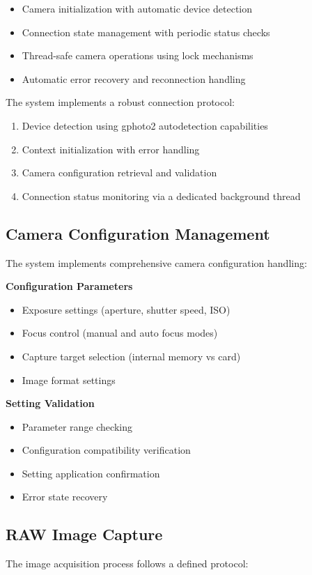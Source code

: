 \begin{itemize}
    \item Camera initialization with automatic device detection
    \item Connection state management with periodic status checks
    \item Thread-safe camera operations using lock mechanisms
    \item Automatic error recovery and reconnection handling
\end{itemize}

The system implements a robust connection protocol:
\begin{enumerate}
    \item Device detection using gphoto2 autodetection capabilities
    \item Context initialization with error handling
    \item Camera configuration retrieval and validation
    \item Connection status monitoring via a dedicated background thread
\end{enumerate}

\subsection{Camera Configuration Management}
The system implements comprehensive camera configuration handling:

\textbf{Configuration Parameters}
\begin{itemize}
    \item Exposure settings (aperture, shutter speed, ISO)
    \item Focus control (manual and auto focus modes)
    \item Capture target selection (internal memory vs card)
    \item Image format settings
\end{itemize}

\textbf{Setting Validation}
\begin{itemize}
    \item Parameter range checking
    \item Configuration compatibility verification
    \item Setting application confirmation
    \item Error state recovery
\end{itemize}

\subsection{RAW Image Capture}
The image acquisition process follows a defined protocol:

